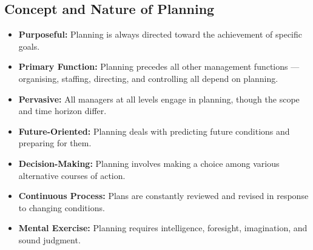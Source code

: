 \documentclass[12pt,a4paper]{article}
\begin{document}
\subsection{Concept and Nature of Planning}
\begin{itemize}[leftmargin=*, itemsep=3pt]
  \item \textbf{Purposeful:} Planning is always directed toward the achievement of specific goals.
  \item \textbf{Primary Function:} Planning precedes all other management functions --- organising, staffing, directing, and controlling all depend on planning.
  \item \textbf{Pervasive:} All managers at all levels engage in planning, though the scope and time horizon differ.
  \item \textbf{Future-Oriented:} Planning deals with predicting future conditions and preparing for them.
  \item \textbf{Decision-Making:} Planning involves making a choice among various alternative courses of action.
  \item \textbf{Continuous Process:} Plans are constantly reviewed and revised in response to changing conditions.
  \item \textbf{Mental Exercise:} Planning requires intelligence, foresight, imagination, and sound judgment.
\end{itemize}
\end{document}
